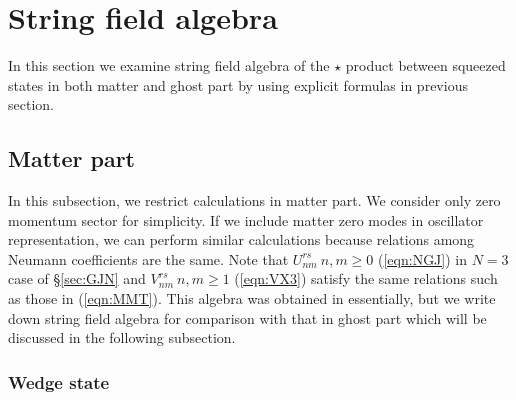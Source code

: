 \documentclass[12pt,a4paper]{article}
\begin{document}
\section{String field algebra \label{sec:ALG}}

In this section we examine string field algebra of  the $\star$ product between squeezed states in both matter and ghost part by using explicit formulas in previous section. 

\subsection{Matter part}

In this subsection, we restrict calculations in matter part. We consider only zero momentum sector for simplicity.
If we include matter zero modes in oscillator representation, we can perform similar calculations  because relations among Neumann coefficients are the same.
Note that $U^{rs}_{nm}\ n,m\geq0$ (\ref{eqn:NGJ}) in $N=3$ case of \S \ref{sec:GJN} and $V^{rs}_{nm}\ n,m\geq1$ (\ref{eqn:VX3}) satisfy the same relations such as those in (\ref{eqn:MMT}).
This algebra was obtained in \cite{RSZ}\cite{FO} essentially, but we write down string field algebra for comparison with that in ghost part which will be discussed in the following subsection.

\subsubsection{Wedge state}
\end{document}
